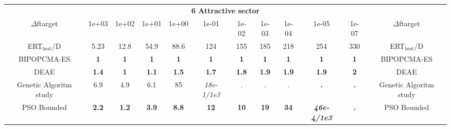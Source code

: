 \begin{tabular}{cccccccccccc}
 & \multicolumn{10}{c}{{\normalsize \textbf{6 Attractive sector}}}\\
$\Delta$ftarget& 1e+03& 1e+02& 1e+01& 1e+00& 1e-01& 1e-02& 1e-03& 1e-04& 1e-05& 1e-07 & $\Delta$ftarget \\
ERT$_{\textrm{best}}$/D& 5.23& 12.8& 54.9& 88.6& 124& 155& 185& 218& 254& 330 & ERT$_{\textrm{best}}$/D \\
\hline
BIPOPCMA-ES & \textbf{1} & \textbf{1} & \textbf{1} & \textbf{1} & \textbf{1} & \textbf{1} & \textbf{1} & \textbf{1} & \textbf{1} & \textbf{1} & BIPOPCMA-ES \cite{add_an_entry_for_BIPOPCMA-ES_in_bbob.bib}\\
DEAE & \textbf{1.4} & \textbf{1} & \textbf{1.1} & \textbf{1.5} & \textbf{1.7} & \textbf{1.8} & \textbf{1.9} & \textbf{1.9} & \textbf{1.9} & \textbf{2} & DEAE \cite{add_an_entry_for_DEAE_in_bbob.bib}\\
Genetic Algoritm study & 6.9 & 4.9 & 6.1 & 85 & \textit{18e-1}\textit{/1e3} & . & . & . & \textbf{.} & \textbf{.} & Genetic Algoritm study \cite{add_an_entry_for_Genetic Algoritm study_in_bbob.bib}\\
PSO Bounded & \textbf{2.2} & \textbf{1.2} & \textbf{3.9} & \textbf{8.8} & \textbf{12} & \textbf{10} & \textbf{19} & \textbf{34} & \textbf{\textit{46e-4}\textit{/1e3}} & \textbf{.} & PSO Bounded \cite{add_an_entry_for_PSO Bounded_in_bbob.bib}
\end{tabular}
